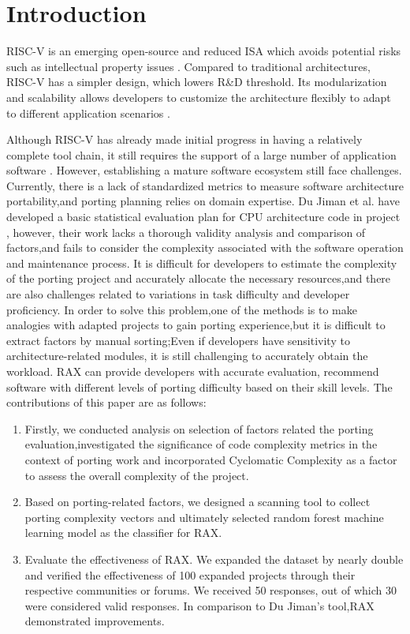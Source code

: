 \documentclass[sigconf,screen,review]{acmart}
\begin{document}
\section{Introduction}
RISC-V is an emerging open-source and reduced ISA which avoids potential risks such as intellectual property issues \cite{2014The}.
Compared to traditional architectures, RISC-V has a simpler design, which lowers R\&D threshold.
Its modularization and scalability allows developers to customize the architecture flexibly to adapt to different application scenarios \cite{osti_1560132}.

Although RISC-V has already made initial progress in having a relatively complete tool chain, it still requires the support of a large number of application software \cite{2019Notary}.
However, establishing a mature software ecosystem still face challenges.
Currently, there is a lack of standardized metrics to measure software architecture portability,and porting planning relies on domain expertise.
Du Jiman et al. have developed a basic statistical evaluation plan for CPU architecture code in project \cite{2023du}, however, their work lacks a thorough validity analysis and comparison of factors,and fails to consider the complexity associated with the software operation and maintenance process.
It is difficult for developers to estimate the complexity of the porting project and accurately allocate the necessary resources,and there are also challenges related to variations in task difficulty and developer proficiency.
In order to solve this problem,one of the methods is to make analogies with adapted projects to gain porting experience,but it is difficult to extract factors by manual sorting;Even if developers have sensitivity to architecture-related modules, it is still challenging to accurately obtain the workload.
RAX can provide developers with accurate evaluation, recommend software with different levels of porting difficulty based on their skill levels.
The contributions of this paper are as follows:
\begin{enumerate}
  \item Firstly, we conducted analysis on selection of factors related the porting evaluation,investigated the significance of code complexity metrics in the context of porting work and incorporated Cyclomatic Complexity as a factor to assess the overall complexity of  the project.
  \item Based on porting-related factors, we designed a scanning tool to collect porting complexity vectors and ultimately selected random forest machine learning model as the classifier for RAX.
  \item Evaluate the effectiveness of RAX.
  We expanded the dataset by nearly double and verified the effectiveness of 100 expanded projects through their respective communities or forums.
  We received 50 responses, out of which 30 were considered valid responses.
  In comparison to Du Jiman's tool,RAX demonstrated  improvements.
\end{enumerate}
\end{document}
